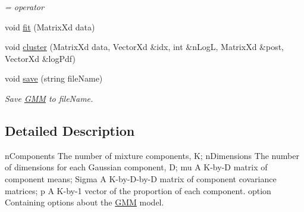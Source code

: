 \begin{DoxyCompactItemize}
\begin{DoxyCompactList}\small\item\em = operator \end{DoxyCompactList}\item 
void \hyperlink{class_g_m_m_a8da11088f8e7371786a80d64fc21e378}{fit} (Matrix\+Xd data)
\item 
void \hyperlink{class_g_m_m_a520a9559626e08e3cb4e9863262da300}{cluster} (Matrix\+Xd data, Vector\+Xd \&idx, int \&n\+Log\+L, Matrix\+Xd \&post, Vector\+Xd \&log\+Pdf)
\item 
\hypertarget{class_g_m_m_af57b5c21205ecd53619f67117555388e}{void \hyperlink{class_g_m_m_af57b5c21205ecd53619f67117555388e}{save} (string file\+Name)}\label{class_g_m_m_af57b5c21205ecd53619f67117555388e}

\begin{DoxyCompactList}\small\item\em Save \hyperlink{class_g_m_m}{G\+M\+M} to file\+Name. \end{DoxyCompactList}\end{DoxyCompactItemize}


\subsection{Detailed Description}
n\+Components The number of mixture components, K; n\+Dimensions The number of dimensions for each Gaussian component, D; mu A K-\/by-\/\+D matrix of component means; Sigma A K-\/by-\/\+D-\/by-\/\+D matrix of component covariance matrices; p A K-\/by-\/1 vector of the proportion of each component. option Containing options about the \hyperlink{class_g_m_m}{G\+M\+M} model. 

